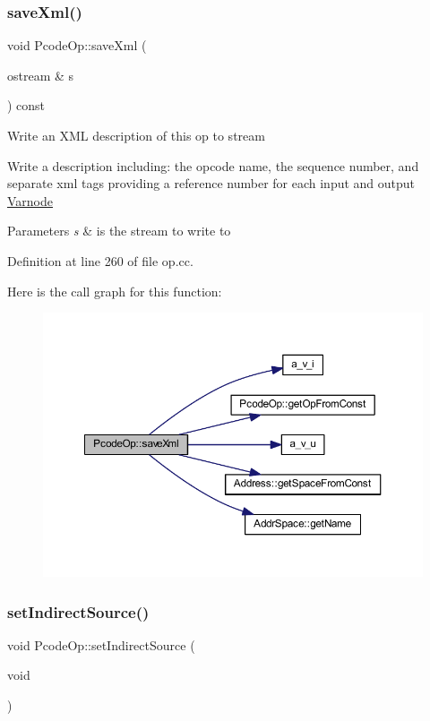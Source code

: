 \subsubsection{\texorpdfstring{saveXml()}{saveXml()}}
{\footnotesize\ttfamily void Pcode\+Op\+::save\+Xml (\begin{DoxyParamCaption}\item[{ostream \&}]{s }\end{DoxyParamCaption}) const}

Write an X\+ML description of this op to stream

Write a description including\+: the opcode name, the sequence number, and separate xml tags providing a reference number for each input and output \mbox{\hyperlink{class_varnode}{Varnode}} 
\begin{DoxyParams}{Parameters}
{\em s} & is the stream to write to \\
\hline
\end{DoxyParams}


Definition at line 260 of file op.\+cc.

Here is the call graph for this function\+:
\nopagebreak
\begin{figure}[H]
\begin{center}
\leavevmode
\includegraphics[width=350pt]{class_pcode_op_a4fc0474bc30c981150acade20eaa1262_cgraph}
\end{center}
\end{figure}
\mbox{\label{class_pcode_op_a475b7a2511390c89d795e839baf69305}} 
\subsubsection{\texorpdfstring{setIndirectSource()}{setIndirectSource()}}
{\footnotesize\ttfamily void Pcode\+Op\+::set\+Indirect\+Source (\begin{DoxyParamCaption}\item[{void}]{ }\end{DoxyParamCaption})\hspace{0.3cm}{\ttfamily [inline]}}



